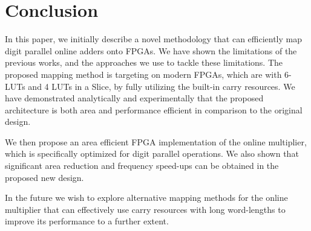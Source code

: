 \documentclass[conference]{IEEEtran}
\begin{document}
\section{Conclusion}
In this paper, we initially describe a novel methodology that can efficiently map digit parallel online adders onto FPGAs. We have shown the limitations of the previous works, and the approaches we use to tackle these limitations. The proposed mapping method is targeting on modern FPGAs, which are with 6-LUTs and 4 LUTs in a Slice, by fully utilizing the built-in carry resources. We have demonstrated analytically and experimentally that the proposed architecture is both area and performance efficient in comparison to the original design. 

We then propose an area efficient FPGA implementation of the online multiplier, which is specifically optimized for digit parallel operations. We also shown that significant area reduction and frequency speed-ups can be obtained in the proposed new design.

In the future we wish to explore alternative mapping methods for the online multiplier that can effectively use carry resources with long word-lengths to improve  its performance to a further extent.











%


\end{document}
